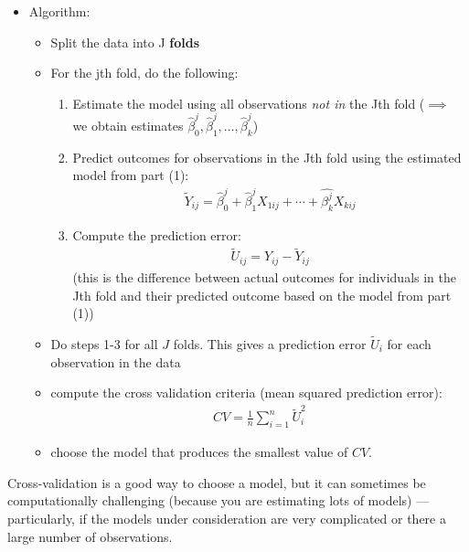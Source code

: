 \documentclass[
  letterpaper,
  DIV=11,
  numbers=noendperiod]{scrreprt}
\begin{document}
\begin{itemize}
\item
  Algorithm:

  \begin{itemize}
  \item
    Split the data into J \textbf{folds}
  \item
    For the jth fold, do the following:

    \begin{enumerate}
    \def\labelenumi{\arabic{enumi}.}
    \item
      Estimate the model using all observations \emph{not in} the Jth
      fold (\(\implies\) we obtain estimates
      \(\hat{\beta}_0^j, \hat{\beta}_1^j, \ldots, \hat{\beta}_k^j\))
    \item
      Predict outcomes for observations in the Jth fold using the
      estimated model from part (1): \begin{align*}
          \tilde{Y}_{ij} = \hat{\beta}_0^j + \hat{\beta}_1^j X_{1ij} + \cdots + \hat{\beta_k^j} X_{kij}
        \end{align*}
    \item
      Compute the prediction error: \begin{align*}
          \tilde{U}_{ij} = Y_{ij} - \tilde{Y}_{ij}
        \end{align*} (this is the difference between actual outcomes for
      individuals in the Jth fold and their predicted outcome based on
      the model from part (1))
    \end{enumerate}
  \item
    Do steps 1-3 for all \(J\) folds. This gives a prediction error
    \(\tilde{U}_i\) for each observation in the data
  \item
    compute the cross validation criteria (mean squared prediction
    error): \begin{align*}
    CV = \frac{1}{n} \sum_{i=1}^n \tilde{U}_{i}^2
      \end{align*}
  \item
    choose the model that produces the smallest value of \(CV\).
  \end{itemize}
\end{itemize}

Cross-validation is a good way to choose a model, but it can sometimes
be computationally challenging (because you are estimating lots of
models) --- particularly, if the models under consideration are very
complicated or there a large number of observations.
\end{document}
